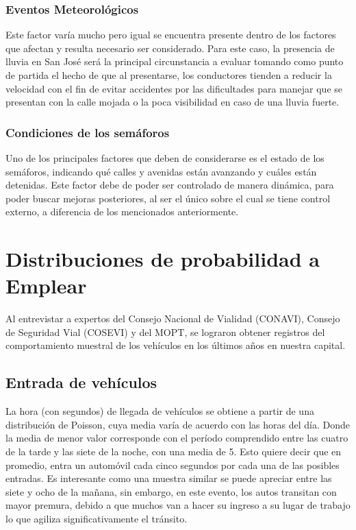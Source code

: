 \documentclass[conference]{IEEEtran}
\begin{document}
\subsubsection{Eventos Meteorol\'{o}gicos}
Este factor var\'{i}a mucho pero igual se encuentra presente dentro de los factores que afectan y resulta necesario ser considerado. Para este caso, la presencia de lluvia en San Jos\'{e} ser\'{a} la principal circunstancia a evaluar tomando como punto de partida el hecho de que al presentarse, los conductores tienden a reducir la velocidad con el fin de evitar accidentes por las dificultades para manejar que se presentan con la calle mojada o la poca visibilidad en caso de una lluvia fuerte.

\subsubsection{Condiciones de los sem\'aforos}
Uno de los principales factores que deben de considerarse es el estado de los sem\'aforos, indicando qu\'e calles y avenidas est\'an avanzando y cu\'ales est\'an detenidas. Este factor debe de poder ser controlado de manera din\'amica, para poder buscar mejoras posteriores, al ser el \'unico sobre el cual se tiene control externo, a diferencia de los mencionados anteriormente.


\section{Distribuciones de probabilidad a Emplear}
Al entrevistar a expertos del Consejo Nacional de Vialidad (CONAVI), Consejo de Seguridad Vial (COSEVI) y del MOPT, se lograron obtener registros del comportamiento muestral de los veh\'iculos en los \'ultimos a\~nos en nuestra capital. 

\subsection{Entrada de veh\'iculos}
La hora (con segundos) de llegada de veh\'iculos se obtiene a partir de una distribuci\'on de Poisson, cuya media var\'ia de acuerdo con las horas del d\'ia. Donde la media de menor valor corresponde con el per\'iodo comprendido entre las cuatro de la tarde y las siete de la noche, con una media de 5. Esto quiere decir que en promedio, entra un autom\'ovil cada cinco segundos por cada una de las posibles entradas. Es interesante como una muestra similar se puede apreciar entre las siete y ocho de la ma\~nana, sin embargo, en este evento, los autos transitan con mayor premura, debido a que muchos van a hacer su ingreso a su lugar de trabajo lo que agiliza significativamente el tr\'ansito.
\end{document}
